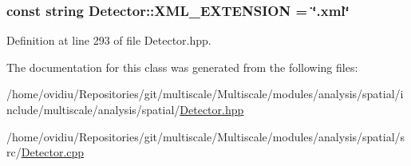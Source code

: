 \hypertarget{classmultiscale_1_1analysis_1_1Detector_a89d56e81155e57f3dcaeef293e89efc2}{
\subsubsection[{\-X\-M\-L\-\_\-\-E\-X\-T\-E\-N\-S\-I\-O\-N}]{\setlength{\rightskip}{0pt plus 5cm}const string {\bf \-Detector\-::\-X\-M\-L\-\_\-\-E\-X\-T\-E\-N\-S\-I\-O\-N} = \char`\"{}.xml\char`\"{}}}\label{classmultiscale_1_1analysis_1_1Detector_a89d56e81155e57f3dcaeef293e89efc2}


\-Definition at line 293 of file \-Detector.\-hpp.



\-The documentation for this class was generated from the following files\-:\begin{DoxyCompactItemize}
\item 
/home/ovidiu/\-Repositories/git/multiscale/\-Multiscale/modules/analysis/spatial/include/multiscale/analysis/spatial/\hyperlink{Detector_8hpp}{\-Detector.\-hpp}\item 
/home/ovidiu/\-Repositories/git/multiscale/\-Multiscale/modules/analysis/spatial/src/\hyperlink{Detector_8cpp}{\-Detector.\-cpp}\end{DoxyCompactItemize}
